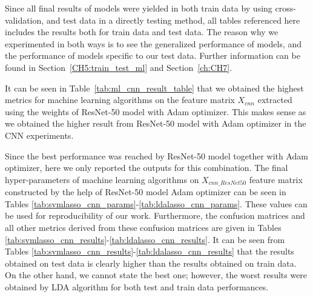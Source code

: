 Since all final results of models were yielded in both train data by using cross-validation, and test data in a directly testing method, all tables referenced here includes the results both for train data and test data. The reason why we experimented in both ways is to see the generalized performance of models, and the performance of models specific to our test data. Further information can be found in Section~\ref{CH5:train_test_ml} and Section~\ref{ch:CH7}.

It can be seen in Table~\ref{tab:ml_cnn_result_table} that we obtained the highest metrics for machine learning algorithms on the feature matrix $X_{cnn}$ extracted using the weights of ResNet-50 model with Adam optimizer. This makes sense as we obtained the higher result from ResNet-50 model with Adam optimizer in the CNN experiments. 

Since the best performance was reached by ResNet-50 model together with Adam optimizer, here we only reported the outputs for this combination. The final hyper-parameters of machine learning algorithms on $X_{cnn\_ResNet50}$ feature matrix constructed by the help of ResNet-50 model Adam optimizer can be seen in Tables \ref{tab:svmlasso_cnn_params}-\ref{tab:ldalasso_cnn_params}. These values can be used for reproducibility of our work. Furthermore, the confusion matrices and all other metrics derived from these confusion matrices are given in Tables \ref{tab:svmlasso_cnn_results}-\ref{tab:ldalasso_cnn_results}.
It can be seen from Tables \ref{tab:svmlasso_cnn_results}-\ref{tab:ldalasso_cnn_results} that the results obtained on test data is clearly higher than the results obtained on train data. On the other hand, we cannot state the best one; however, the worst results were obtained by LDA algorithm for both test and train data performances. 

